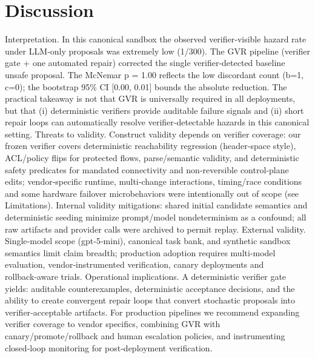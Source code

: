 \documentclass[conference]{IEEEtran}
\begin{document}
\section{Discussion}
Interpretation. In this canonical sandbox the observed verifier‑visible hazard rate under LLM‑only proposals was extremely low (1/300). The GVR pipeline (verifier gate + one automated repair) corrected the single verifier‑detected baseline unsafe proposal. The McNemar p = 1.00 reflects the low discordant count (b=1, c=0); the bootstrap 95\% CI [0.00, 0.01] bounds the absolute reduction. The practical takeaway is not that GVR is universally required in all deployments, but that (i) deterministic verifiers provide auditable failure signals and (ii) short repair loops can automatically resolve verifier‑detectable hazards in this canonical setting. Threats to validity. Construct validity depends on verifier coverage: our frozen verifier covers deterministic reachability regression (header‑space style), ACL/policy flips for protected flows, parse/semantic validity, and deterministic safety predicates for mandated connectivity and non‑reversible control‑plane edits; vendor‑specific runtime, multi‑change interactions, timing/race conditions and some hardware failover microbehaviors were intentionally out of scope (see Limitations). Internal validity mitigations: shared initial candidate semantics and deterministic seeding minimize prompt/model nondeterminism as a confound; all raw artifacts and provider calls were archived to permit replay. External validity. Single‑model scope (gpt‑5‑mini), canonical task bank, and synthetic sandbox semantics limit claim breadth; production adoption requires multi‑model evaluation, vendor‑instrumented verification, canary deployments and rollback‑aware trials. Operational implications. A deterministic verifier gate yields: auditable counterexamples, deterministic acceptance decisions, and the ability to create convergent repair loops that convert stochastic proposals into verifier‑acceptable artifacts. For production pipelines we recommend expanding verifier coverage to vendor specifics, combining GVR with canary/promote/rollback and human escalation policies, and instrumenting closed‑loop monitoring for post‑deployment verification.
\end{document}
